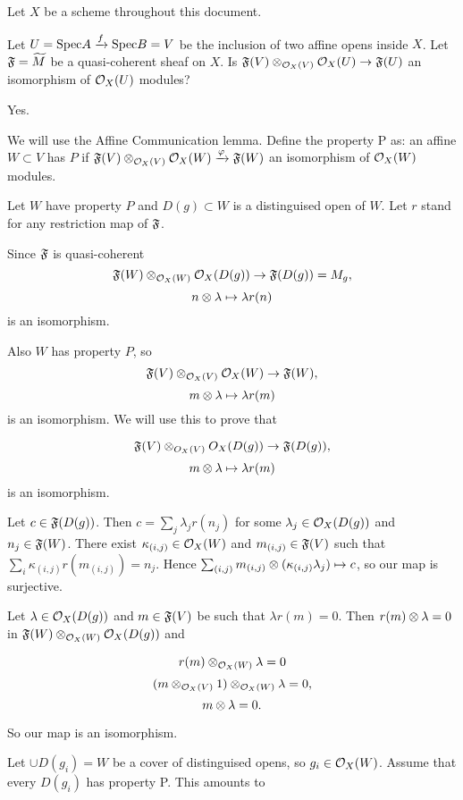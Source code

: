 



Let $X$ be a scheme throughout this document.

\begin{question}
Let $U=\Spec A \xrightarrow{f} \Spec B = V$ be the inclusion of two affine opens inside $X$.
Let $\mathfrak{F}=\widetilde{M}$ be a quasi-coherent sheaf on $X$. 
Is $\mathfrak{F}(V)\otimes_{\mathcal{O}_X(V)} \mathcal{O}_X(U) \rightarrow \mathfrak{F}(U)$ an isomorphism of $\mathcal{O}_X(U)$ modules?
\end{question}

\begin{Qanswer}
Yes. 

We will use the Affine Communication lemma.
Define the property P as:
an affine $W\subset V$ has $P$ if $\mathfrak{F}(V)\otimes_{\mathcal{O}_X(V)} \mathcal{O}_X(W) \xrightarrow{\varphi} \mathfrak{F}(W)$ an isomorphism of $\mathcal{O}_X(W)$ modules.

Let $W$ have property $P$ and $D(g)\subset W$ is a distinguised open of $W$.
Let $r$ stand for any restriction map of $\mathfrak{F}$.

Since $\mathfrak{F}$ is quasi-coherent
\[\mathfrak{F}(W)\otimes_{\mathcal{O}_X(W)} \mathcal{O}_X(D(g)) \rightarrow \mathfrak{F}(D(g))= M_g,\]
\[ n \otimes \lambda \mapsto \lambda r(n)\]
is an isomorphism.

Also $W$ has property $P$, so 
\[\mathfrak{F}(V)\otimes_{\mathcal{O}_X(V)} \mathcal{O}_X(W) \rightarrow \mathfrak{F}(W),\]
\[ m \otimes \lambda \mapsto \lambda r(m)\]
is an isomorphism.
We will use this to prove that 

\[\mathfrak{F}(V)\otimes_{O_X(V)} O_X(D(g)) \rightarrow \mathfrak{F}(D(g)),\]
\[m \otimes \lambda \mapsto \lambda r(m)\]
is an isomorphism.

Let $c \in \mathfrak{F}(D(g))$. 
Then $c= \sum_j \lambda_j r(n_j)$ for some $\lambda_j\in \mathcal{O}_X(D(g))$ and $n_j\in\mathfrak{F}(W)$.
There exist $\kappa_{(i,j)} \in \mathcal{O}_X(W)$ and $m_{(i,j)}\in \mathfrak{F}(V)$ such that $\sum_i \kappa_{(i,j)} r(m_{(i,j)})= n_j$.
Hence $\sum_{(i,j)} m_{(i,j)} \otimes (\kappa_{(i,j)}\lambda_j)\mapsto c$, so our map is surjective.

Let $\lambda\in \mathcal{O}_X(D(g))$ and $m\in \mathfrak{F}(V)$ be such that $\lambda r(m)=0$.
Then $r(m) \otimes \lambda = 0$ in $\mathfrak{F}(W)\otimes_{\mathcal{O}_X(W)} \mathcal{O}_X(D(g))$ and

\[ r(m) \otimes_{\mathcal{O}_X(W)} \lambda = 0\]
\[(m\otimes_{\mathcal{O}_X(V)} 1) \otimes_{\mathcal{O}_X(W)} \lambda = 0,\]
\[ m\otimes \lambda = 0 .\]

So our map is an isomorphism.

Let $\cup D(g_i) = W$ be a cover of distinguised opens, so $g_i\in \mathcal{O}_X(W)$.
Assume that every $D(g_i)$ has property P.
This amounts to


\end{Qanswer}

